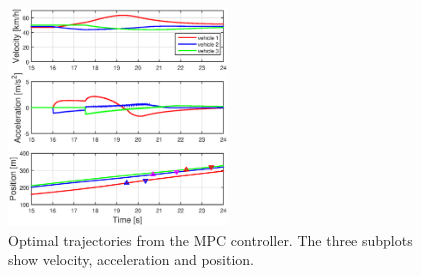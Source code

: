 \documentclass[letterpaper,10pt,conference]{ieeeconf}
\begin{document}
\begin{figure}[h!]
    \centering
    \includegraphics[width=0.52\textwidth]{plots_dpc.eps}
    \caption{Optimal trajectories from the MPC controller. The three subplots show velocity, acceleration and position.}
    \label{fig:sim_results}
\end{figure}
\end{document}
